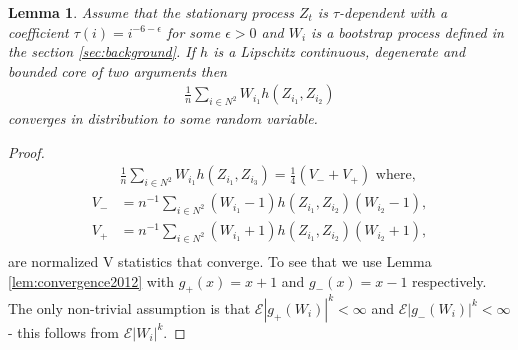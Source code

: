\documentclass{article} %
\newtheorem{lemma}{Lemma}
\newcommand{\ev}{\mathcal{E}}
\begin{document}
\begin{lemma}
\label{lem:oneWtrick}
Assume that the stationary process $Z_t$ is $\tau$-dependent with a coefficient $\tau(i) = i^{-6-\epsilon}$ for some $\epsilon>0$ and $W_i$ is a bootstrap process defined in the section \ref{sec:background}. If $h$ is a Lipschitz continuous, degenerate and bounded core of two arguments then 
\begin{align}
\frac{1}{n} \sum_{i \in N^2} W_{i_1} h(Z_{i_1},Z_{i_2}) 
\end{align}
converges in distribution to some random variable.
\end{lemma}
\begin{proof}
\begin{align}
\label{eq:h2eq1}
& \frac{1}{n} \sum_{i \in N^2} W_{i_1}  h(Z_{i_1},Z_{i_3}) = \frac 1 4 (V_{-} + V_{+}) \text{ where,} \\   
V_{-} &= n^{-1} \sum_{i \in N^2} (W_{i_1}-1)h(Z_{i_1},Z_{i_2})(W_{i_2}-1), \\
V_{+} &= n^{-1} \sum_{i \in N^2}  (W_{i_1}+1)h(Z_{i_1},Z_{i_2})(W_{i_2}+1), \\ 
\end{align}
are normalized V statistics that converge. To see that we use Lemma \ref{lem:convergence2012} with $g_{+}(x)=x+1$ and $g_{-}(x)=x-1$ respectively. The only non-trivial assumption is that $\ev|g_{+}(W_i)|^k < \infty$ and $\ev|g_{-}(W_i)|^k<\infty$  - this follows from $\ev |W_i|^k$. 
\end{proof}
\end{document}
